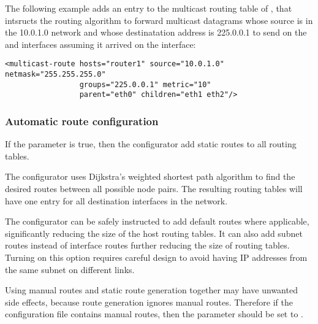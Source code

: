 The following example adds an entry to the multicast routing table of ,
that intsructs the routing algorithm to forward multicast datagrams whose source
is in the 10.0.1.0 network and whose destinatation address is 225.0.0.1 to
send on the  and  interfaces assuming it arrived on the
 interface:

\begin{verbatim}
<multicast-route hosts="router1" source="10.0.1.0" netmask="255.255.255.0"
                 groups="225.0.0.1" metric="10"
                 parent="eth0" children="eth1 eth2"/>
\end{verbatim}

\subsubsection*{Automatic route configuration}

If the  parameter is true, then
the configurator add static routes to all routing tables.

The configurator uses Dijkstra's weighted shortest path algorithm to find
the desired routes between all possible node pairs. The resulting
routing tables will have one entry for all destination interfaces in the
network.


The configurator can be safely instructed to add default routes
where applicable, significantly reducing the size of the host routing
tables. It can also add subnet routes instead of interface routes further
reducing the size of routing tables. Turning on this option requires
careful design to avoid having IP addresses from the same subnet on
different links.


\begin{caution}
Using manual routes and static route generation
together may have unwanted side effects, because route generation ignores
manual routes. Therefore if the configuration file contains
manual routes, then the  parameter should be set
to .
\end{caution}

